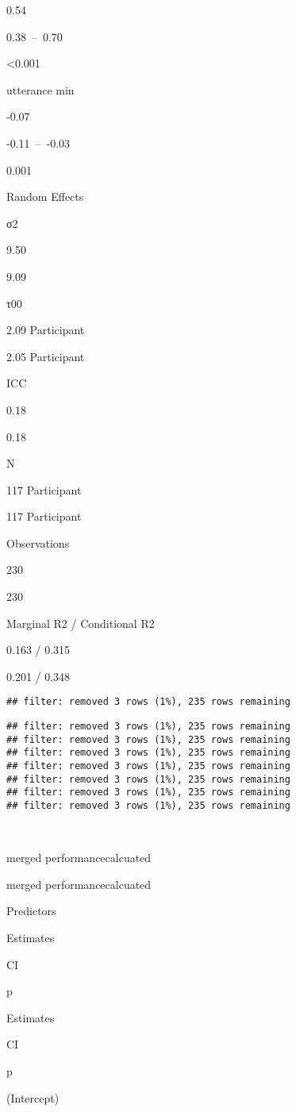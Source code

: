\documentclass[
]{article}
\begin{document}
0.54

0.38~--~0.70

\textless0.001

utterance min

-0.07

-0.11~--~-0.03

0.001

Random Effects

σ2

9.50

9.09

τ00

2.09 Participant

2.05 Participant

ICC

0.18

0.18

N

117 Participant

117 Participant

Observations

230

230

Marginal R2 / Conditional R2

0.163 / 0.315

0.201 / 0.348

\begin{verbatim}
## filter: removed 3 rows (1%), 235 rows remaining
\end{verbatim}

\begin{verbatim}
## filter: removed 3 rows (1%), 235 rows remaining
## filter: removed 3 rows (1%), 235 rows remaining
## filter: removed 3 rows (1%), 235 rows remaining
## filter: removed 3 rows (1%), 235 rows remaining
## filter: removed 3 rows (1%), 235 rows remaining
## filter: removed 3 rows (1%), 235 rows remaining
## filter: removed 3 rows (1%), 235 rows remaining
\end{verbatim}

~

merged performancecalcuated

merged performancecalcuated

Predictors

Estimates

CI

p

Estimates

CI

p

(Intercept)
\end{document}
